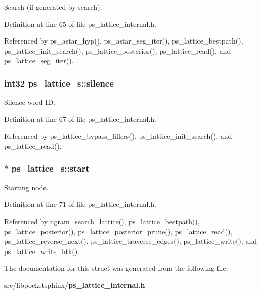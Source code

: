 Search (if generated by search). 



Definition at line 65 of file ps\-\_\-lattice\-\_\-internal.\-h.



Referenced by ps\-\_\-astar\-\_\-hyp(), ps\-\_\-astar\-\_\-seg\-\_\-iter(), ps\-\_\-lattice\-\_\-bestpath(), ps\-\_\-lattice\-\_\-init\-\_\-search(), ps\-\_\-lattice\-\_\-posterior(), ps\-\_\-lattice\-\_\-read(), and ps\-\_\-lattice\-\_\-seg\-\_\-iter().

\subsubsection[{silence}]{\setlength{\rightskip}{0pt plus 5cm}int32 ps\-\_\-lattice\-\_\-s\-::silence}\label{structps__lattice__s_acd3f3ab2649f649ba33bf2a422cf12b8}


Silence word I\-D. 



Definition at line 67 of file ps\-\_\-lattice\-\_\-internal.\-h.



Referenced by ps\-\_\-lattice\-\_\-bypass\-\_\-fillers(), ps\-\_\-lattice\-\_\-init\-\_\-search(), and ps\-\_\-lattice\-\_\-read().

\subsubsection[{start}]{$\ast$ ps\-\_\-lattice\-\_\-s\-::start}\label{structps__lattice__s_a5d936695a3813e117d20b585d48db8fe}


Starting node. 



Definition at line 71 of file ps\-\_\-lattice\-\_\-internal.\-h.



Referenced by ngram\-\_\-search\-\_\-lattice(), ps\-\_\-lattice\-\_\-bestpath(), ps\-\_\-lattice\-\_\-posterior(), ps\-\_\-lattice\-\_\-posterior\-\_\-prune(), ps\-\_\-lattice\-\_\-read(), ps\-\_\-lattice\-\_\-reverse\-\_\-next(), ps\-\_\-lattice\-\_\-traverse\-\_\-edges(), ps\-\_\-lattice\-\_\-write(), and ps\-\_\-lattice\-\_\-write\-\_\-htk().



The documentation for this struct was generated from the following file\-:\begin{DoxyCompactItemize}
\item 
src/libpocketsphinx/{\bf ps\-\_\-lattice\-\_\-internal.\-h}\end{DoxyCompactItemize}
